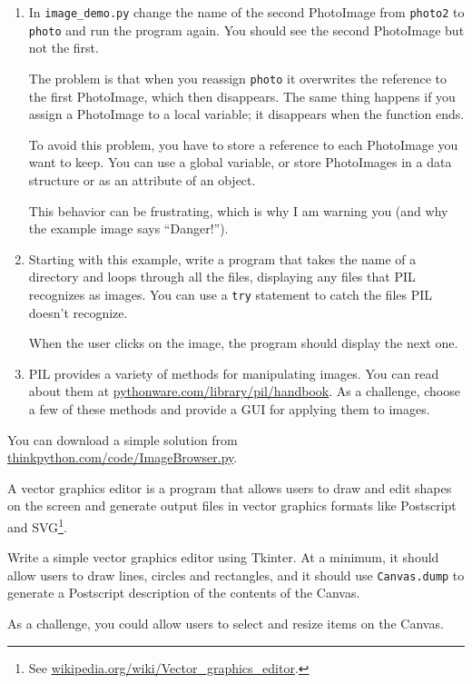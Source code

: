 \documentclass[10pt]{book}
\begin{document}
\begin{ex}
\begin{enumerate}
\item In \verb"image_demo.py" change the name of the second
PhotoImage from {\tt photo2} to {\tt photo} and run the program
again.  You should see the second PhotoImage but not the first.

The problem is that when you reassign {\tt photo} it overwrites
the reference to the first PhotoImage, which then disappears.  The
same thing happens if you assign a PhotoImage to a local
variable; it disappears when the function ends.

To avoid this problem, you have to store a reference to each
PhotoImage you want to keep.  You can use a global variable, or
store PhotoImages in a data structure or as an attribute of
an object.

This behavior can be frustrating, which is why I am warning
you (and why the example image says ``Danger!'').


\item Starting with this example, write a program that takes
the name of a directory and loops through all the files, displaying
any files that PIL recognizes as images.  You can use a {\tt try}
statement to catch the files PIL doesn't recognize.

When the user clicks on the image, the program should display the next one.

\item PIL provides a variety of methods for manipulating images.
You can read about them at \url{pythonware.com/library/pil/handbook}.
As a challenge, choose a few of these methods and provide a
GUI for applying them to images.

\end{enumerate}

You can download a simple solution from
\url{thinkpython.com/code/ImageBrowser.py}.

\end{ex}


\begin{ex}


A vector graphics editor is a program that allows users to draw and
edit shapes on the screen and generate output files in vector graphics
formats like Postscript and SVG\footnote{See
  \url{wikipedia.org/wiki/Vector_graphics_editor}.}.

Write a simple vector graphics editor using Tkinter.  At a
minimum, it should allow users to draw lines, circles and
rectangles, and it should use {\tt Canvas.dump} to
generate a Postscript description of the contents of the
Canvas.

As a challenge, you could allow users to select and resize
items on the Canvas.

\end{ex}
\end{document}
